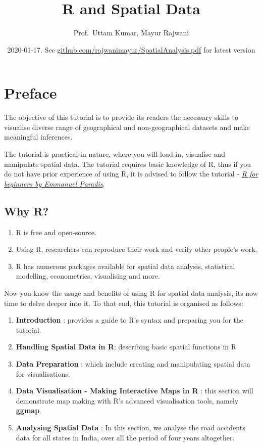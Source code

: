\documentclass[]{article}
\title{R and Spatial Data}
\author{Prof.~Uttam Kumar, Mayur Rajwani}
\date{2020-01-17. See
\href{https://github.com/rajwanimayur/SpatialAnalysis}{github.com/rajwanimayur/SpatialAnalysis.pdf}
for latest version}
\providecommand{\tightlist}{%
  \setlength{\itemsep}{0pt}\setlength{\parskip}{0pt}}
\begin{document}
\maketitle

{
\setcounter{tocdepth}{2}
\tableofcontents
}
\hypertarget{preface}{%
\section{Preface}\label{preface}}

The objective of this tutorial is to provide its readers the necessary
skills to visualise diverse range of geographical and non-geographical
datasets and make meaningful inferences.

The tutorial is practical in nature, where you will load-in, visualise
and manipulate spatial data. The tutorial requires basic knowledge of R,
thus if you do not have prior experience of using R, it is advised to
follow the tutorial -
\href{https://cran.r-project.org/doc/contrib/Paradis-rdebuts_en.pdf}{\emph{R
for beginners by Emmanuel Paradis}}.

\hypertarget{why-r}{%
\subsection{Why R?}\label{why-r}}

\begin{enumerate}
\def\labelenumi{\arabic{enumi}.}
\tightlist
\item
  R is free and open-source.
\item
  Using R, researchers can reproduce their work and verify other
  people's work.
\item
  R has numerous packages available for spatial data analysis,
  statistical modelling, econometrics, visualising and more.
\end{enumerate}

Now you know the usage and benefits of using R for spatial data
analysis, its now time to delve deeper into it. To that end, this
tutorial is organised as follows:

\begin{enumerate}
\def\labelenumi{\arabic{enumi}.}
\tightlist
\item
  \textbf{Introduction} : provides a guide to R's syntax and preparing
  you for the tutorial.
\item
  \textbf{Handling Spatial Data in R}: describing basic spatial
  functions in R
\item
  \textbf{Data Preparation} : which include creating and manipulating
  spatial data for visualisations.
\item
  \textbf{Data Visualisation - Making Interactive Maps in R} : this
  section will demonstrate map making with R's advanced visualisation
  tools, namely \textbf{ggmap}.
\item
  \textbf{Analysing Spatial Data} : In this section, we analyse the road
  accidents data for all states in India, over all the period of four
  years altogether.
\end{enumerate}
\end{document}
